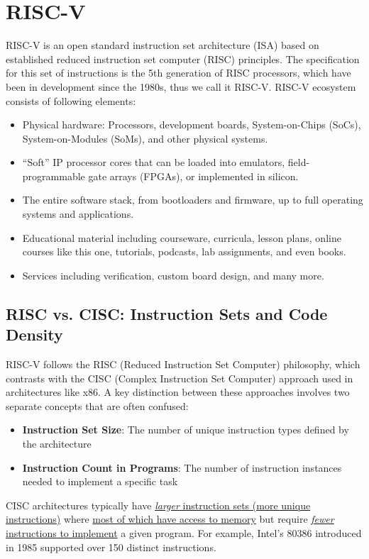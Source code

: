 \documentclass[12pt, a4paper]{article}
\begin{document}
\section{RISC-V}

RISC-V is an open standard instruction set architecture (ISA) based on established reduced instruction set computer (RISC) principles. The specification for this set of instructions is the 5th generation of RISC processors, which have been in development since the 1980s, thus we call it RISC-V. RISC-V ecosystem consists of following elements:
\begin{itemize}
    \item Physical hardware: Processors, development boards, System-on-Chips (SoCs), System-on-Modules (SoMs), and other physical systems.
    \item ``Soft'' IP processor cores that can be loaded into emulators, field-programmable gate arrays (FPGAs), or implemented in silicon.
    \item The entire software stack, from bootloaders and firmware, up to full operating systems and applications.
    \item Educational material including courseware, curricula, lesson plans, online courses like this one, tutorials, podcasts, lab assignments, and even books.
    \item Services including verification, custom board design, and many more.
\end{itemize} 

\subsection{RISC vs. CISC: Instruction Sets and Code Density}
RISC-V follows the RISC (Reduced Instruction Set Computer) philosophy, which contrasts with the CISC (Complex Instruction Set Computer) approach used in architectures like x86. A key distinction between these approaches involves two separate concepts that are often confused:

\begin{itemize}
    \item \textbf{Instruction Set Size}: The number of unique instruction types defined by the architecture
    \item \textbf{Instruction Count in Programs}: The number of instruction instances needed to implement a specific task
\end{itemize}

CISC architectures typically have \ul{\textit{larger} instruction sets (more unique instructions)} where \ul{most of which have access to memory} but require \ul{\textit{fewer} instructions to implement} a given program. For example, Intel's 80386 introduced in 1985 supported over 150 distinct instructions.
\end{document}
